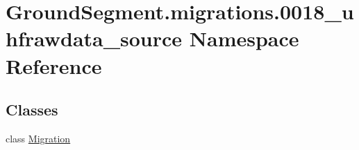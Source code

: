 \hypertarget{namespace_ground_segment_1_1migrations_1_10018__uhfrawdata__source}{}\section{Ground\+Segment.\+migrations.0018\+\_\+uhfrawdata\+\_\+source Namespace Reference}
\label{namespace_ground_segment_1_1migrations_1_10018__uhfrawdata__source}
\subsection*{Classes}
\begin{DoxyCompactItemize}
\item 
class \hyperlink{class_ground_segment_1_1migrations_1_10018__uhfrawdata__source_1_1_migration}{Migration}
\end{DoxyCompactItemize}
